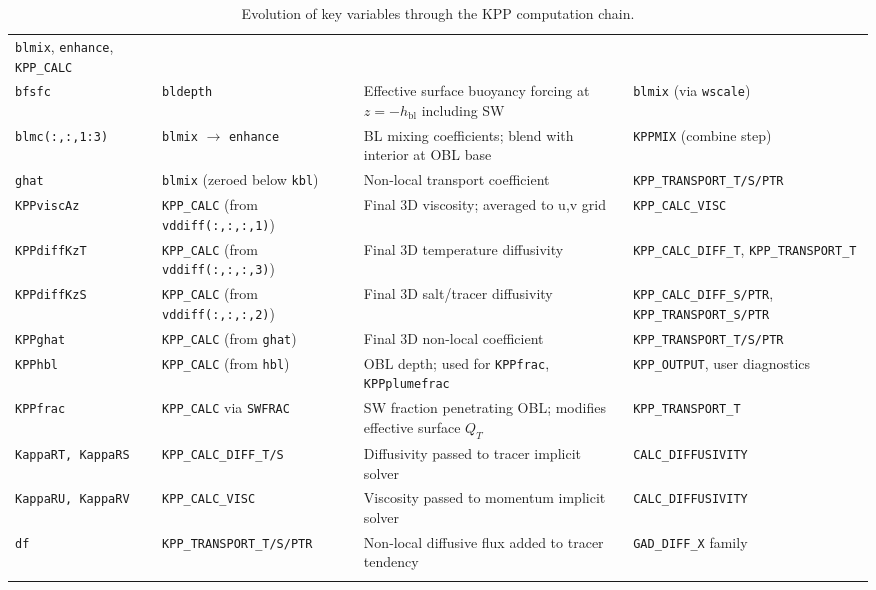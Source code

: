 \documentclass[12pt,letterpaper]{article}
\newcommand{\hbl}{h_{\mathrm{bl}}}
\begin{document}
\begin{longtable}{p{2.8cm} p{2.8cm} p{5cm} l}
  \texttt{blmix}, \texttt{enhance}, \texttt{KPP\_CALC} \\[4pt]  
\texttt{bfsfc} &  
  \texttt{bldepth} &  
  Effective surface buoyancy forcing at $z = -\hbl$ including SW &  
  \texttt{blmix} (via \texttt{wscale}) \\[4pt]  
\texttt{blmc(:,:,1:3)} &  
  \texttt{blmix} $\to$ \texttt{enhance} &  
  BL mixing coefficients; blend with interior at OBL base &  
  \texttt{KPPMIX} (combine step) \\[4pt]  
\texttt{ghat} &  
  \texttt{blmix} (zeroed below \texttt{kbl}) &  
  Non-local transport coefficient &  
  \texttt{KPP\_TRANSPORT\_T/S/PTR} \\[4pt]  
\texttt{KPPviscAz} &  
  \texttt{KPP\_CALC} (from \texttt{vddiff(:,:,:,1)}) &  
  Final 3D viscosity; averaged to u,v grid &  
  \texttt{KPP\_CALC\_VISC} \\[4pt]  
\texttt{KPPdiffKzT} &  
  \texttt{KPP\_CALC} (from \texttt{vddiff(:,:,:,3)}) &  
  Final 3D temperature diffusivity &  
  \texttt{KPP\_CALC\_DIFF\_T}, \texttt{KPP\_TRANSPORT\_T} \\[4pt]  
\texttt{KPPdiffKzS} &  
  \texttt{KPP\_CALC} (from \texttt{vddiff(:,:,:,2)}) &  
  Final 3D salt/tracer diffusivity &  
  \texttt{KPP\_CALC\_DIFF\_S/PTR}, \texttt{KPP\_TRANSPORT\_S/PTR} \\[4pt]  
\texttt{KPPghat} &  
  \texttt{KPP\_CALC} (from \texttt{ghat}) &  
  Final 3D non-local coefficient &  
  \texttt{KPP\_TRANSPORT\_T/S/PTR} \\[4pt]  
\texttt{KPPhbl} &  
  \texttt{KPP\_CALC} (from \texttt{hbl}) &  
  OBL depth; used for \texttt{KPPfrac}, \texttt{KPPplumefrac} &  
  \texttt{KPP\_OUTPUT}, user diagnostics \\[4pt]  
\texttt{KPPfrac} &  
  \texttt{KPP\_CALC} via \texttt{SWFRAC} &  
  SW fraction penetrating OBL; modifies effective surface $Q_T$ &  
  \texttt{KPP\_TRANSPORT\_T} \\[4pt]  
\texttt{KappaRT, KappaRS} &  
  \texttt{KPP\_CALC\_DIFF\_T/S} &  
  Diffusivity passed to tracer implicit solver &  
  \texttt{CALC\_DIFFUSIVITY} \\[4pt]  
\texttt{KappaRU, KappaRV} &  
  \texttt{KPP\_CALC\_VISC} &  
  Viscosity passed to momentum implicit solver &  
  \texttt{CALC\_DIFFUSIVITY} \\[4pt]  
\texttt{df} &  
  \texttt{KPP\_TRANSPORT\_T/S/PTR} &  
  Non-local diffusive flux added to tracer tendency &  
  \texttt{GAD\_DIFF\_X} family \\  
\bottomrule  
\caption{Evolution of key variables through the KPP computation chain.}  
\label{tab:varflow}  
\end{longtable}  
  
\end{document}
